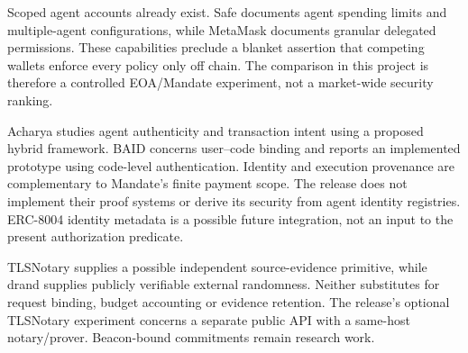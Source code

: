 Scoped agent accounts already exist. Safe documents agent spending limits and multiple-agent configurations, while MetaMask documents granular delegated permissions.\citep{safe,metamask} These capabilities preclude a blanket assertion that competing wallets enforce every policy only off chain. The comparison in this project is therefore a controlled EOA/Mandate experiment, not a market-wide security ranking.

Acharya studies agent authenticity and transaction intent using a proposed hybrid framework.\citep{acharya} BAID concerns user--code binding and reports an implemented prototype using code-level authentication.\citep{baid} Identity and execution provenance are complementary to Mandate's finite payment scope. The release does not implement their proof systems or derive its security from agent identity registries. ERC-8004 identity metadata is a possible future integration, not an input to the present authorization predicate.\citep{erc8004}

TLSNotary supplies a possible independent source-evidence primitive, while drand supplies publicly verifiable external randomness.\citep{tlsnotary,drand} Neither substitutes for request binding, budget accounting or evidence retention. The release's optional TLSNotary experiment concerns a separate public API with a same-host notary/prover. Beacon-bound commitments remain research work.
